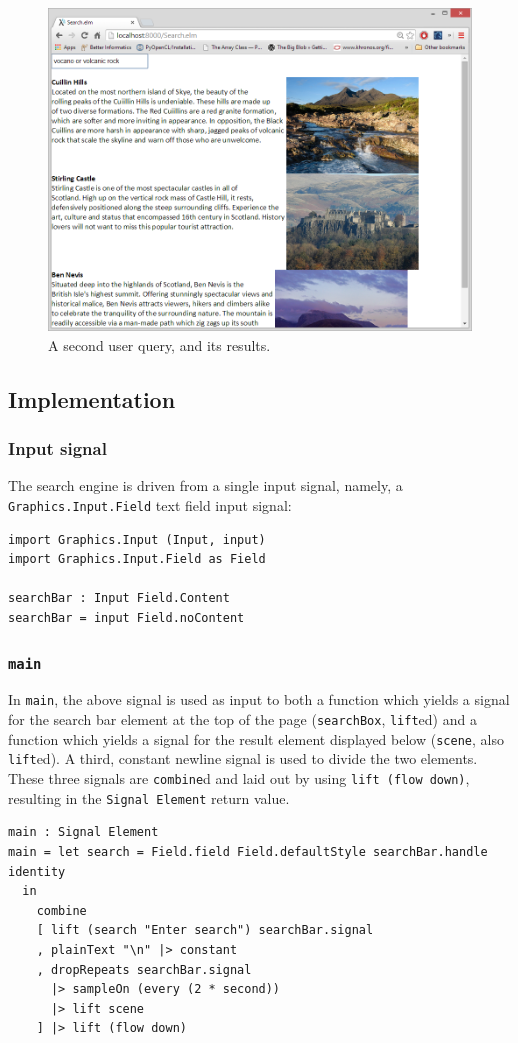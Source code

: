 \documentclass[12pt]{article}
\begin{document}
\begin{figure}[ht!]
\centering
\includegraphics[width=140mm]{volcano_or_volcanic_rock.png}
\caption{A second user query, and its results.}
\end{figure}

\subsection{Implementation}
\subsubsection{Input signal}
The search engine is driven from a single input signal, namely, a \texttt{Graphics.Input.Field} text field input signal:
\begin{samepage}
\begin{verbatim}
import Graphics.Input (Input, input)
import Graphics.Input.Field as Field

searchBar : Input Field.Content
searchBar = input Field.noContent
\end{verbatim}
\end{samepage}
\subsubsection{\texttt{main}}
\label{sec:main}
In \texttt{main}, the above signal is used as input to both a function which yields a signal for the search bar element at the top of the page (\texttt{searchBox}, \texttt{lift}ed) and a function which yields a signal for the result element displayed below (\texttt{scene}, also \texttt{lift}ed). A third, constant newline signal is used to divide the two elements. These
three signals are \texttt{combine}d and laid out by using \texttt{lift (flow down)}, resulting in the \texttt{Signal Element} return value.
\begin{samepage}
\begin{verbatim}
main : Signal Element
main = let search = Field.field Field.defaultStyle searchBar.handle identity
  in
    combine
    [ lift (search "Enter search") searchBar.signal
    , plainText "\n" |> constant
    , dropRepeats searchBar.signal 
      |> sampleOn (every (2 * second)) 
      |> lift scene
    ] |> lift (flow down)
\end{verbatim}
\end{samepage}
\end{document}
